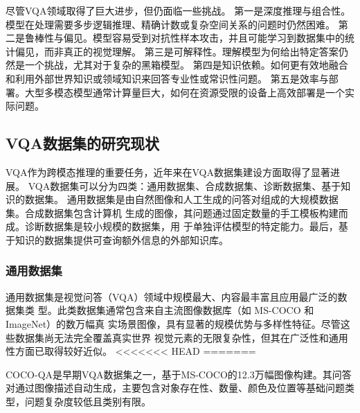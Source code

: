 尽管VQA领域取得了巨大进步，但仍面临一些挑战。
第一是深度推理与组合性。模型在处理需要多步逻辑推理、精确计数或复杂空间关系的问题时仍然困难。
第二是鲁棒性与偏见。模型容易受到对抗性样本攻击，并且可能学习到数据集中的统计偏见，而非真正的视觉理解。
第三是可解释性。理解模型为何给出特定答案仍然是一个挑战，尤其对于复杂的黑箱模型。
第四是知识依赖。如何更有效地融合和利用外部世界知识或领域知识来回答专业性或常识性问题。
第五是效率与部署。大型多模态模型通常计算量巨大，如何在资源受限的设备上高效部署是一个实际问题。
\subsection{VQA数据集的研究现状}
VQA作为跨模态推理的重要任务，近年来在VQA数据集建设方面取得了显著进展。
VQA数据集可以分为四类：通用数据集、合成数据集、诊断数据集、基于知识的数据集。
通用数据集是由自然图像和人工生成的问答对组成的大规模数据集。合成数据集包含计算机
生成的图像，其问题通过固定数量的手工模板构建而成。诊断数据集是较小规模的数据集，用
于单独评估模型的特定能力。最后，基于知识的数据集提供可查询额外信息的外部知识库。
\subsubsection{通用数据集}
通用数据集是视觉问答（VQA）领域中规模最大、内容最丰富且应用最广泛的数据集类
型。此类数据集通常包含来自主流图像数据库（如 MS-COCO\cite{lin2014microsoft} 和 ImageNet\cite{deng2009imagenet}）的数万幅真
实场景图像，具有显著的规模优势与多样性特征。尽管这些数据集尚无法完全覆盖真实世界
视觉元素的无限复杂性，但其在广泛性和通用性方面已取得较好近似。
<<<<<<< HEAD
=======

COCO-QA是早期VQA数据集之一，基于MS-COCO的12.3万幅图像构建。其问答对通过图像描述自动生成，主要包含对象存在性、数量、颜色及位置等基础问题类型，问题复杂度较低且类别有限。

